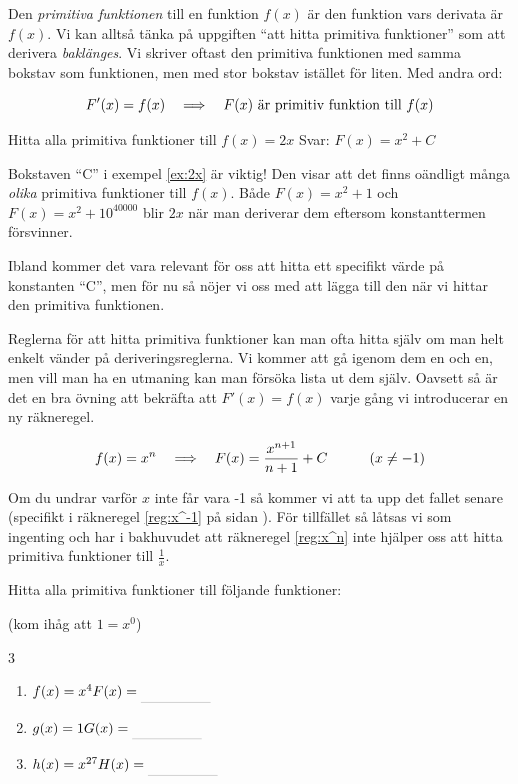 \documentclass[a4paper, 12pt]{article}
\begin{document}
Den \emph{primitiva funktionen} till en funktion $f(x)$ är den funktion vars derivata är $f(x)$. Vi kan alltså tänka på uppgiften ``att hitta primitiva funktioner'' som att derivera \emph{baklänges}. Vi skriver oftast den primitiva funktionen med samma bokstav som funktionen, men med stor bokstav istället för liten. Med andra ord:

\[F'(x) = f(x) \hspace{1em} \Longrightarrow \hspace{1em} F(x) \textrm{ är primitiv funktion till } f(x)\]


\begin{exempel}
    \label{ex:2x}
    Hitta alla primitiva funktioner till $f(x) = 2x$
    \dinkus
    Svar: $F(x) = x^2 + C$
\end{exempel}

Bokstaven ``C'' i exempel \ref{ex:2x} är viktig! Den visar att det finns oändligt många \emph{olika} primitiva funktioner till $f(x)$. Både $F(x) = x^2 + 1$ och $F(x) = x^2 + 10^{40000}$ blir $2x$ när man deriverar dem eftersom konstanttermen försvinner.

Ibland kommer det vara relevant för oss att hitta ett specifikt värde på konstanten ``C'', men för nu så nöjer vi oss med att lägga till den när vi hittar den primitiva funktionen.

Reglerna för att hitta primitiva funktioner kan man ofta hitta själv om man helt enkelt vänder på deriveringsreglerna. Vi kommer att gå igenom dem en och en, men vill man ha en utmaning kan man försöka lista ut dem själv. Oavsett så är det en bra övning att bekräfta att $F'(x) = f(x)$ varje gång vi introducerar en ny räkneregel.

\begin{regel}
    \label{reg:x^n}
    \[f(x) = x^n \hspace{1em} \Longrightarrow \hspace{1em} F(x) = \dfrac {x^{n+1}}{n+1} + C \hspace{3em} (x\neq -1)\]
\end{regel}

Om du undrar varför $x$ inte får vara -1 så kommer vi att ta upp det fallet senare (specifikt i räkneregel \ref{reg:x^-1} på sidan \pageref{reg:x^-1}). För tillfället så låtsas vi som ingenting och har i bakhuvudet att räkneregel \ref{reg:x^n} inte hjälper oss att hitta primitiva funktioner till $\frac 1x$.

\begin{uppgifter}
    \label{upp:x^n}
    Hitta alla primitiva funktioner till följande funktioner: 
    
    (kom ihåg att $1=x^0$)
    \begin{multicols}{3}
        \begin{enumerate}
            \item $f(x) = x^4 \\ F(x) \ans$
            \item $g(x) = 1 \\ G(x) \ans$
            \item $h(x) = x^{27} \\ H(x) \ans$
        \end{enumerate}
    \end{multicols}
\end{uppgifter}
\end{document}
